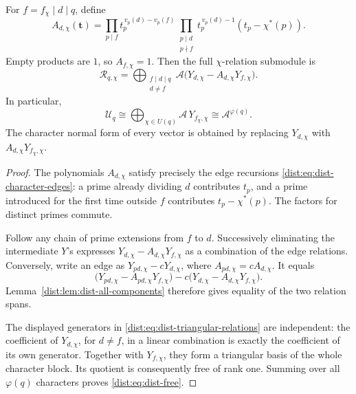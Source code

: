 \begin{theorem}
\label{dist:thm:dist-normal-form}
For \(f=f_\chi\mid d\mid q\), define
\begin{equation}
 A_{d,\chi}(\mathbf t)=
 \prod_{p\mid f}t_p^{\,v_p(d)-v_p(f)}
 \prod_{\substack{p\mid d\\p\nmid f}}
       t_p^{\,v_p(d)-1}(t_p-\chi^*(p)).
 \label{dist:eq:dist-normal-coefficient}
\end{equation}
Empty products are \(1\), so \(A_{f,\chi}=1\).
Then the full \(\chi\)-relation submodule is
\begin{equation}
 \mathcal R_{q,\chi}
 =\bigoplus_{\substack{f\mid d\mid q\\d\ne f}}
   \mathcal A\bigl(Y_{d,\chi}-A_{d,\chi}Y_{f,\chi}\bigr).
 \label{dist:eq:dist-triangular-relations}
\end{equation}
In particular,
\begin{equation}
 \mathcal U_q\cong
 \bigoplus_{\chi\in\widehat{U(q)}}\mathcal A\,Y_{f_\chi,\chi}
 \cong\mathcal A^{\varphi(q)}.
 \label{dist:eq:dist-free}
\end{equation}
The character normal form of every vector is obtained by replacing
\(Y_{d,\chi}\) with \(A_{d,\chi}Y_{f_\chi,\chi}\).
\end{theorem}

\begin{proof}
The polynomials \(A_{d,\chi}\) satisfy precisely the edge recursions
\eqref{dist:eq:dist-character-edges}: a prime already dividing \(d\)
contributes \(t_p\), and a prime introduced for the first time
outside \(f\) contributes \(t_p-\chi^*(p)\).
The factors for distinct primes commute.

Follow any chain of prime extensions from \(f\) to \(d\).
Successively eliminating the intermediate \(Y\)'s expresses
\(Y_{d,\chi}-A_{d,\chi}Y_{f,\chi}\) as a combination of the
edge relations. Conversely, write an edge as
\(Y_{pd,\chi}-cY_{d,\chi}\), where
\(A_{pd,\chi}=cA_{d,\chi}\). It equals
\[
 \bigl(Y_{pd,\chi}-A_{pd,\chi}Y_{f,\chi}\bigr)
 -c\bigl(Y_{d,\chi}-A_{d,\chi}Y_{f,\chi}\bigr).
 \]
Lemma~\ref{dist:lem:dist-all-components} therefore gives equality of the
two relation spans.

The displayed generators in \eqref{dist:eq:dist-triangular-relations}
are independent: the coefficient of \(Y_{d,\chi}\), for \(d\ne f\),
in a linear combination is exactly the coefficient of its own
generator. Together with \(Y_{f,\chi}\), they form a triangular
basis of the whole character block. Its quotient is consequently
free of rank one. Summing over all \(\varphi(q)\) characters proves
\eqref{dist:eq:dist-free}.
\end{proof}

